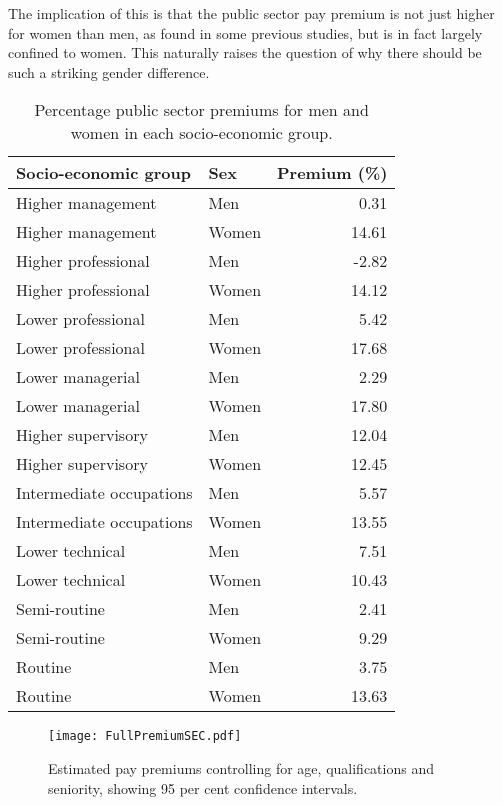 \documentclass[a4paper,11pt,titlepage]{article}
\begin{document}
The implication of this is that the public sector pay premium is not just higher for women than men, as found in some previous studies, but is in fact largely confined to women.  This naturally raises the question of why there should be such a striking gender difference.

\begin{table}[ht]
    \caption{Percentage public sector premiums for men and women in each socio-economic group. \label{tab:fullprem}}
    \begin{center}
    \begin{tabular}{llr}
\toprule
     Socio-economic group & Sex & Premium (\%) \\
\midrule
  Higher management & Men & 0.31 \\
  Higher management & Women & 14.61 \\
  Higher professional & Men & -2.82 \\
  Higher professional & Women & 14.12 \\
  Lower professional & Men & 5.42 \\
  Lower professional & Women & 17.68 \\
  Lower managerial & Men & 2.29 \\
  Lower managerial & Women & 17.80 \\
  Higher supervisory & Men & 12.04 \\
  Higher supervisory & Women & 12.45 \\
  Intermediate occupations & Men & 5.57 \\
  Intermediate occupations & Women & 13.55 \\
  Lower technical & Men & 7.51 \\
  Lower technical & Women & 10.43 \\
  Semi-routine & Men & 2.41 \\
  Semi-routine & Women & 9.29 \\
  Routine & Men & 3.75 \\
  Routine & Women & 13.63 \\
\bottomrule
    \end{tabular}
    \end{center}
\end{table}

\begin{figure}
    \texttt{[image: FullPremiumSEC.pdf]}
    \caption{Estimated pay premiums controlling for age, qualifications and seniority,
    showing 95 per cent confidence intervals.\label{fig:full}}
\end{figure}
\end{document}
